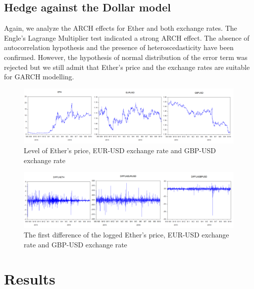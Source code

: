 \documentclass[11pt]{report}
\begin{document}
	\subsection*{Hedge against the Dollar model}

Again, we analyze the ARCH effects for Ether and both exchange rates. The Engle’s Lagrange Multiplier test indicated a strong ARCH effect. The absence of autocorrelation hypothesis and the presence of heteroscedasticity have been confirmed. However, the hypothesis of normal distribution of the error term was rejected but we still admit that Ether’s price and the exchange rates are suitable for GARCH modelling.
\medbreak
\begin{figure}[!h]
\caption{Level of Ether’s price, EUR-USD exchange rate and GBP-USD exchange rate}
\centerline{\includegraphics[scale=0.9]{Chap3/Figure3}}
\label{FIG33}
\end{figure}
\medbreak
\begin{figure}[!h]
\caption{The first difference of the logged Ether’s price, EUR-USD exchange rate and GBP-USD exchange rate}
\centerline{\includegraphics[scale=0.9]{Chap3/Figure4}}
\label{FIG34}
\end{figure}

\clearpage
\section{Results}
\end{document}
